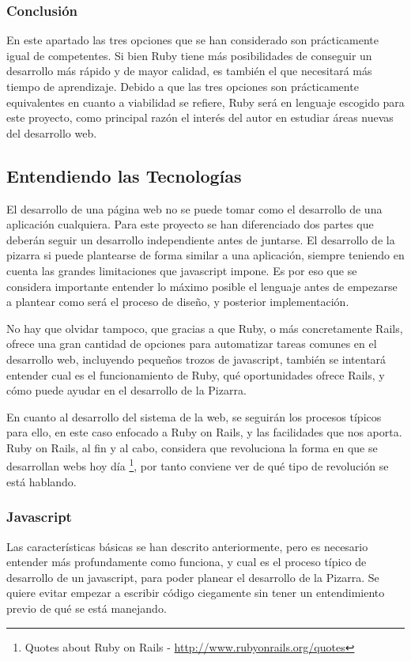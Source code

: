 \subsubsection{Conclusión}
En este apartado las tres opciones que se han considerado son prácticamente igual de competentes. Si bien Ruby tiene más posibilidades de conseguir un desarrollo más rápido y de mayor calidad, es también el que necesitará más tiempo de aprendizaje. Debido a que las tres opciones son prácticamente equivalentes en cuanto a viabilidad se refiere, Ruby será en lenguaje escogido para este proyecto, como principal razón el interés del autor en estudiar áreas nuevas del desarrollo web.

\subsection{Entendiendo las Tecnologías}
El desarrollo de una página web no se puede tomar como el desarrollo de una aplicación cualquiera. Para este proyecto se han diferenciado dos partes que deberán seguir un desarrollo independiente antes de juntarse. El desarrollo de la pizarra si puede plantearse de forma similar a una aplicación, siempre teniendo en cuenta las grandes limitaciones que javascript impone. Es por eso que se considera importante entender lo máximo posible el lenguaje antes de empezarse a plantear como será el proceso de diseño, y posterior implementación.

No hay que olvidar tampoco, que gracias a que Ruby, o más concretamente Rails, ofrece una gran cantidad de opciones para automatizar tareas comunes en el desarrollo web, incluyendo pequeños trozos de javascript, también se intentará entender cual es el funcionamiento de Ruby, qué oportunidades ofrece Rails, y cómo puede ayudar en el desarrollo de la Pizarra.

En cuanto al desarrollo del sistema de la web, se seguirán los procesos típicos para ello, en este caso enfocado a Ruby on Rails, y las facilidades que nos aporta. Ruby on Rails, al fin y al cabo, considera que revoluciona la forma en que se desarrollan webs hoy día \footnote{Quotes about Ruby on Rails - \url{http://www.rubyonrails.org/quotes}}, por tanto conviene ver de qué tipo de revolución se está hablando.

\subsubsection{Javascript}
Las características básicas se han descrito anteriormente, pero es necesario entender más profundamente como funciona, y cual es el proceso típico de desarrollo de un javascript, para poder planear el desarrollo de la Pizarra. Se quiere evitar empezar a escribir código ciegamente sin tener un entendimiento previo de qué se está manejando.

